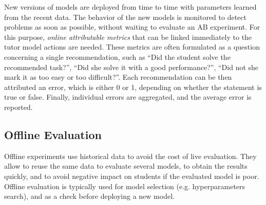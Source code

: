 
New versions of models are deployed from time to time
  with parameters learned from the recent data.
The behavior of the new models is monitored
  to detect problems as soon as possible,
  without waiting to evaluate an AB experiment.
For this purpose, \emph{online attributable metrics} that can be linked
  immediately to the tutor model actions are needed.
These metrics are often formulated as a question concerning a single recommendation,
such as
``Did the student solve the recommended task?'',
``Did she solve it with a good performance?'',
``Did not she mark it as too easy or too difficult?''.
Each recommendation can be then attributed an error, which is either 0 or 1, depending
on whether the statement is true or false.
Finally, individual errors are aggregated, and the average error is reported.





\subsection{Offline Evaluation}

Offline experiments use historical data to avoid the cost of live evaluation.
They allow to reuse the same data to evaluate several models,
  to obtain the results quickly,
  and to avoid negative impact on students if the evaluated model is poor.
Offline evaluation is typically used
for model selection (e.g. hyperparameters search),
and as a check before deploying a new model. %


